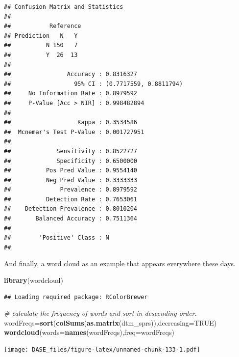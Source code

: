 \documentclass[]{book}
\newenvironment{Shaded}{\begin{snugshade}}{\end{snugshade}}
\newcommand{\KeywordTok}[1]{\textcolor[rgb]{0.13,0.29,0.53}{\textbf{{#1}}}}
\newcommand{\DataTypeTok}[1]{\textcolor[rgb]{0.13,0.29,0.53}{{#1}}}
\newcommand{\CommentTok}[1]{\textcolor[rgb]{0.56,0.35,0.01}{\textit{{#1}}}}
\newcommand{\OtherTok}[1]{\textcolor[rgb]{0.56,0.35,0.01}{{#1}}}
\newcommand{\NormalTok}[1]{{#1}}
\begin{document}
\begin{verbatim}
## Confusion Matrix and Statistics
## 
##           Reference
## Prediction   N   Y
##          N 150   7
##          Y  26  13
##                                                 
##                Accuracy : 0.8316327             
##                  95% CI : (0.7717559, 0.8811794)
##     No Information Rate : 0.8979592             
##     P-Value [Acc > NIR] : 0.998482894           
##                                                 
##                   Kappa : 0.3534586             
##  Mcnemar's Test P-Value : 0.001727951           
##                                                 
##             Sensitivity : 0.8522727             
##             Specificity : 0.6500000             
##          Pos Pred Value : 0.9554140             
##          Neg Pred Value : 0.3333333             
##              Prevalence : 0.8979592             
##          Detection Rate : 0.7653061             
##    Detection Prevalence : 0.8010204             
##       Balanced Accuracy : 0.7511364             
##                                                 
##        'Positive' Class : N                     
## 
\end{verbatim}

And finally, a word cloud as an example that appears everywhere these
days.

\begin{Shaded}
\begin{Highlighting}[]
\KeywordTok{library}\NormalTok{(wordcloud)}
\end{Highlighting}
\end{Shaded}

\begin{verbatim}
## Loading required package: RColorBrewer
\end{verbatim}

\begin{Shaded}
\begin{Highlighting}[]
\CommentTok{# calculate the frequency of words and sort in descending order.}
\NormalTok{wordFreqs=}\KeywordTok{sort}\NormalTok{(}\KeywordTok{colSums}\NormalTok{(}\KeywordTok{as.matrix}\NormalTok{(dtm_sprs)),}\DataTypeTok{decreasing=}\OtherTok{TRUE}\NormalTok{)}
\KeywordTok{wordcloud}\NormalTok{(}\DataTypeTok{words=}\KeywordTok{names}\NormalTok{(wordFreqs),}\DataTypeTok{freq=}\NormalTok{wordFreqs)}
\end{Highlighting}
\end{Shaded}

\texttt{[image: DASE\_files/figure-latex/unnamed-chunk-133-1.pdf]}
\end{document}
